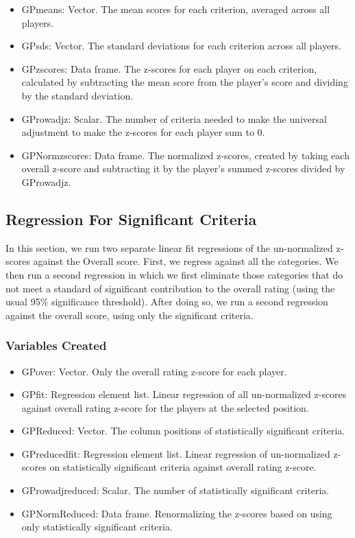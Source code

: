 \documentclass[11pt]{article}
\begin{document}
\begin{itemize}
\item{GPmeans}: Vector. The mean scores for each criterion, averaged across all players.
\item{GPsds}: Vector. The standard deviations for each criterion across all players.
\item{GPzscores}: Data frame. The z-scores for each player on each criterion, calculated by subtracting the mean score from the player's score and dividing by the standard deviation.
\item{GProwadjz}: Scalar. The number of criteria needed to make the universal adjustment to make the z-scores for each player sum to 0.
\item{GPNormzscores}: Data frame. The normalized z-scores, created by taking each overall z-score and subtracting it by the player's summed z-scores divided by GProwadjz.
\end{itemize}

\subsection{Regression For Significant Criteria}

In this section, we run two separate linear fit regressions of the un-normalized z-scores against the Overall score. First, we regress against all the categories. We then run a second regression in which we first eliminate those categories that do not meet a standard of significant contribution to the overall rating (using the usual 95\% significance threshold). After doing so, we run a second regression against the overall score, using only the significant criteria.

\subsubsection{Variables Created}

\begin{itemize}
\item{GPover}: Vector. Only the overall rating z-score for each player.
\item{GPfit}: Regression element list. Linear regression of all un-normalized z-scores against overall rating z-score for the players at the selected position. 
\item{GPReduced}: Vector. The column positions of statistically significant criteria.
\item{GPreducedfit:} Regression element list. Linear regression of un-normalized z-scores on statistically significant criteria against overall rating z-score.
\item{GProwadjreduced:} Scalar. The number of statistically significant criteria.
\item{GPNormReduced:} Data frame. Renormalizing the z-scores based on using only statistically significant criteria.
\end{itemize}
\end{document}
